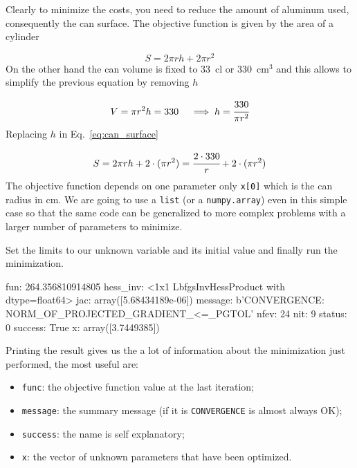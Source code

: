 Clearly to minimize the costs, you need to reduce the amount of aluminum used, consequently the can surface. 
The objective function is given by the area of a cylinder

\begin{equation} 
S = 2\pi rh + 2\pi r^2 
\label{eq:can_surface}
\end{equation}
On the other hand the can volume is fixed to 33~cl or 330~$\mathrm{cm}^3$ and this allows to simplify the previous equation by removing $h$

\begin{equation*} 
V = \pi r^2 h = 330\quad\implies h = \cfrac{330}{\pi r^2}
\end{equation*}
Replacing $h$ in Eq.~\ref{eq:can_surface} 

\begin{equation}
S = 2\pi rh + 2\cdot(\pi r^2) = \cfrac{2\cdot 330}{r} + 2\cdot(\pi r^2)
\end{equation}
The objective function depends on one parameter only \texttt{x[0]} which is the can radius in cm. We are going to use a \texttt{list} (or a \texttt{numpy.array}) even in this simple case so that the same code can be generalized to more complex problems with a larger number of parameters to minimize. 


Set the limits to our unknown variable and its initial value and finally run the minimization.

\begin{ioutput}
      fun: 264.356810914805
 hess_inv: <1x1 LbfgsInvHessProduct with dtype=float64>
      jac: array([5.68434189e-06])
  message: b'CONVERGENCE: NORM_OF_PROJECTED_GRADIENT_<=_PGTOL'
     nfev: 24
      nit: 9
   status: 0
  success: True
        x: array([3.7449385])
\end{ioutput}

Printing the result gives us the a lot of information about the minimization just performed, the most useful are:
\begin{itemize}
\item \texttt{func}: the objective function value at the last iteration;
\item \texttt{message}: the summary message (if it is \texttt{CONVERGENCE} is almost always OK);
\item \texttt{success}: the name is self explanatory;
\item \texttt{x}: the vector of unknown parameters that have been optimized.
\end{itemize}

